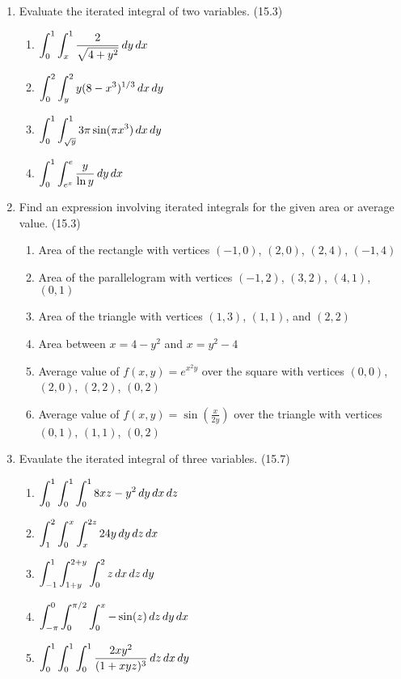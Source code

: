 \begin{enumerate}
    \newpage

    \item Evaluate the iterated integral of two variables. (15.3)

      \begin{enumerate}
        \item $\displaystyle\int_0^1\int_x^1 \frac{2}{\sqrt{4+y^2}}\,d{y}\,d{x}$
        \item $\displaystyle\int_0^2\int_y^2 y(8-x^3)^{1/3}\,d{x}\,d{y}$
        \item $\displaystyle\int_0^1\int_{\sqrt{y}}^1 3\pi \sin(\pi x^3)\,d{x}\,d{y}$
        \item $\displaystyle\int_0^1\int_{e^x}^e \frac{y}{\ln y}\,d{y}\,d{x}$
      \end{enumerate}

    \item Find an expression involving iterated integrals for the given area or average value. (15.3)

      \begin{enumerate}
        \item Area of the rectangle with vertices $(-1,0)$, $(2,0)$, $(2,4)$, $(-1,4)$
        \item Area of the parallelogram with vertices $(-1,2)$, $(3,2)$, $(4,1)$, $(0,1)$
        \item Area of the triangle with vertices $(1,3)$, $(1,1)$, and $(2,2)$
        \item Area between $x=4-y^2$ and $x=y^2-4$
        \item Average value of $f(x,y)=e^{x^2y}$ over the square with vertices $(0,0)$, $(2,0)$, $(2,2)$, $(0,2)$
        \item Average value of $f(x,y)=\sin(\frac{x}{2y})$ over the triangle with vertices $(0,1)$, $(1,1)$, $(0,2)$
      \end{enumerate}

    \item Evaulate the iterated integral of three variables. (15.7)

      \begin{enumerate}
        \item $\displaystyle\int_0^1\int_0^1\int_0^1 8xz-y^2\,d{y}\,d{x}\,d{z}$
        \item $\displaystyle\int_1^2\int_0^x\int_x^{2z} 24y\,d{y}\,d{z}\,d{x}$
        \item $\displaystyle\int_{-1}^1\int_{1+y}^{2+y}\int_0^2 z \,d{x}\,d{z}\,d{y}$
        \item $\displaystyle\int_{-\pi}^0\int_0^{\pi/2}\int_0^x -\sin(z) \,d{z}\,d{y}\,d{x}$
        \item $\displaystyle\int_0^1\int_0^1\int_0^1 \frac{2xy^2}{(1+xyz)^3}\,d{z}\,d{x}\,d{y}$
      \end{enumerate}


\end{enumerate}
